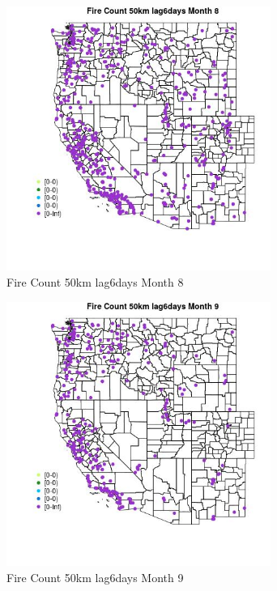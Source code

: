 \begin{figure} 
\centering  
\includegraphics[width=0.77\textwidth]{Code_Outputs/Report_ML_input_PM25_Step4_part_e_de_duplicated_aves_compiled_2019-05-18wNAs_MapObsMo8Fire_Count_50km_lag6days.jpg} 
\caption{\label{fig:Report_ML_input_PM25_Step4_part_e_de_duplicated_aves_compiled_2019-05-18wNAsMapObsMo8Fire_Count_50km_lag6days}Fire Count 50km lag6days Month 8} 
\end{figure} 
 

\begin{figure} 
\centering  
\includegraphics[width=0.77\textwidth]{Code_Outputs/Report_ML_input_PM25_Step4_part_e_de_duplicated_aves_compiled_2019-05-18wNAs_MapObsMo9Fire_Count_50km_lag6days.jpg} 
\caption{\label{fig:Report_ML_input_PM25_Step4_part_e_de_duplicated_aves_compiled_2019-05-18wNAsMapObsMo9Fire_Count_50km_lag6days}Fire Count 50km lag6days Month 9} 
\end{figure} 
 

